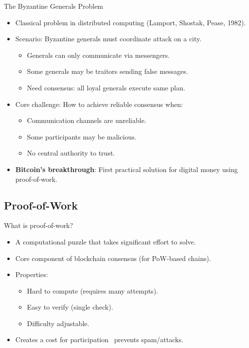 \documentclass[aspectratio=169, lualatex, handout]{beamer}
\begin{document}
\begin{frame}{The Byzantine Generals Problem}
	\begin{itemize}
		\item Classical problem in distributed computing (Lamport, Shostak, Pease, 1982).
		\item Scenario: Byzantine generals must coordinate attack on a city.
		      \begin{itemize}
			      \item Generals can only communicate via messengers.
			      \item Some generals may be traitors sending false messages.
			      \item Need consensus: all loyal generals execute same plan.
		      \end{itemize}
		\item Core challenge: How to achieve reliable consensus when:
		      \begin{itemize}
			      \item Communication channels are unreliable.
			      \item Some participants may be malicious.
			      \item No central authority to trust.
		      \end{itemize}
		\item \textbf{Bitcoin's breakthrough}: First practical solution for digital money using proof-of-work.
	\end{itemize}
\end{frame}

\subsection{Proof-of-Work}

\begin{frame}{What is proof-of-work?}
	\begin{itemize}
		\item A computational puzzle that takes significant effort to solve.
		\item Core component of blockchain consensus (for PoW-based chains).
		\item Properties:
		      \begin{itemize}
			      \item Hard to compute (requires many attempts).
			      \item Easy to verify (single check).
			      \item Difficulty adjustable.
		      \end{itemize}
		\item Creates a cost for participation \rightarrow\ prevents spam/attacks.
	\end{itemize}
\end{frame}
\end{document}

